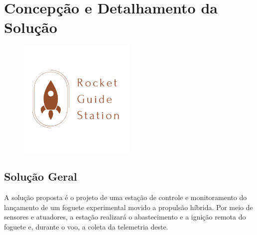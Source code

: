 \chapter{Concepção e Detalhamento da Solução}

\begin{figure}[H]
    \centering
    \includegraphics[width=0.5\textwidth]{figuras/rgs_35.png}
\end{figure}

\section{Solução Geral}
\par A solução proposta é o projeto de uma estação de controle e monitoramento do lançamento de um foguete experimental movido a propulsão híbrida. Por meio de sensores e atuadores, a estação realizará o abastecimento e a ignição remota do foguete e, durante o voo, a coleta da telemetria deste.








